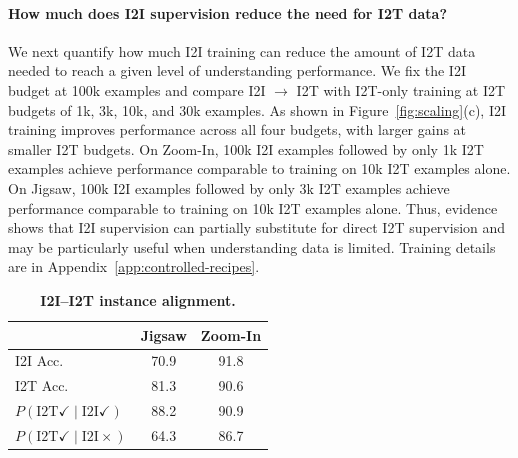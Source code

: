 \paragraph{How much does I2I supervision reduce the need for I2T data?}
We next quantify how much I2I training can reduce the amount of I2T data needed to reach a given level of understanding performance.
We fix the I2I budget at 100k examples and compare I2I $\rightarrow$ I2T with I2T-only training at I2T budgets of 1k, 3k, 10k, and 30k examples.
As shown in Figure~\ref{fig:scaling}(c), I2I training improves performance across all four budgets, with larger gains at smaller I2T budgets.
On Zoom-In, 100k I2I examples followed by only 1k I2T examples achieve performance comparable to training on 10k I2T examples alone. 
On Jigsaw, 100k I2I examples followed by only 3k I2T examples achieve performance comparable to training on 10k I2T examples alone.
Thus, evidence shows that I2I supervision can partially substitute for direct I2T supervision and may be particularly useful when understanding data is limited.
Training details are in Appendix~\ref{app:controlled-recipes}.
\par\addvspace{3pt}
\begingroup
\setlength{\intextsep}{2pt}
\setlength{\columnsep}{5pt}
\begin{table}
    \centering
    \small
    \setlength{\tabcolsep}{3pt}
    \setlength{\abovecaptionskip}{0pt}
    \makeatletter
    \def\@captype{table}
    \long{}
    \makeatother
    \caption{\textbf{I2I--I2T instance alignment.}}   \label{tab:controlled_instance_alignment}
    \begin{tabular}{@{}lcc@{}}
        \toprule
        & Jigsaw & Zoom-In \\
        \midrule
        I2I Acc. & 70.9 & 91.8 \\
        I2T Acc. & 81.3 & 90.6 \\
        $P(\mathrm{I2T}\checkmark\mid\mathrm{I2I}\checkmark)$ & 88.2 & 90.9 \\
        $P(\mathrm{I2T}\checkmark\mid\mathrm{I2I}\times)$ & 64.3 & 86.7 \\
        \bottomrule
    \end{tabular}
\end{table}
